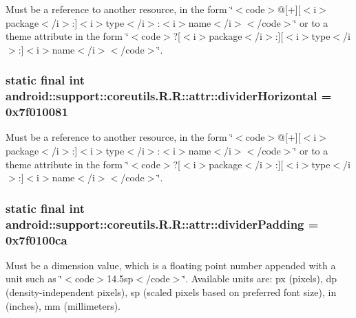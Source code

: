 Must be a reference to another resource, in the form \char`\"{}$<$code$>$@\mbox{[}+\mbox{]}\mbox{[}$<$i$>$package$<$/i$>$:\mbox{]}$<$i$>$type$<$/i$>$:$<$i$>$name$<$/i$>$$<$/code$>$\char`\"{} or to a theme attribute in the form \char`\"{}$<$code$>$?\mbox{[}$<$i$>$package$<$/i$>$:\mbox{]}\mbox{[}$<$i$>$type$<$/i$>$:\mbox{]}$<$i$>$name$<$/i$>$$<$/code$>$\char`\"{}. \hypertarget{classandroid_1_1support_1_1coreutils_1_1_r_1_1attr_fed1dfa87de44d101965062fb8ff5690}{
\subsubsection[{dividerHorizontal}]{\setlength{\rightskip}{0pt plus 5cm}static final int android::support::coreutils.R.R::attr::dividerHorizontal = 0x7f010081}}
\label{classandroid_1_1support_1_1coreutils_1_1_r_1_1attr_fed1dfa87de44d101965062fb8ff5690}


Must be a reference to another resource, in the form \char`\"{}$<$code$>$@\mbox{[}+\mbox{]}\mbox{[}$<$i$>$package$<$/i$>$:\mbox{]}$<$i$>$type$<$/i$>$:$<$i$>$name$<$/i$>$$<$/code$>$\char`\"{} or to a theme attribute in the form \char`\"{}$<$code$>$?\mbox{[}$<$i$>$package$<$/i$>$:\mbox{]}\mbox{[}$<$i$>$type$<$/i$>$:\mbox{]}$<$i$>$name$<$/i$>$$<$/code$>$\char`\"{}. \hypertarget{classandroid_1_1support_1_1coreutils_1_1_r_1_1attr_9f7f2917788a64756c76c5defac91743}{
\subsubsection[{dividerPadding}]{\setlength{\rightskip}{0pt plus 5cm}static final int android::support::coreutils.R.R::attr::dividerPadding = 0x7f0100ca}}
\label{classandroid_1_1support_1_1coreutils_1_1_r_1_1attr_9f7f2917788a64756c76c5defac91743}


Must be a dimension value, which is a floating point number appended with a unit such as \char`\"{}$<$code$>$14.5sp$<$/code$>$\char`\"{}. Available units are: px (pixels), dp (density-independent pixels), sp (scaled pixels based on preferred font size), in (inches), mm (millimeters). 

